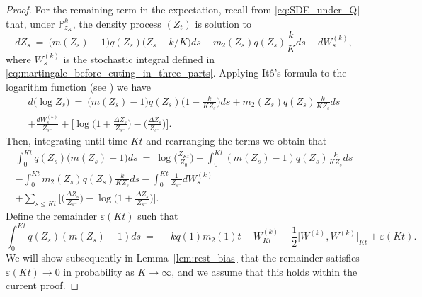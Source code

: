 \begin{refsegment}
\begin{proof}
For the remaining term in the expectation, recall from
\eqref{eq:SDE_under_Q} that, under $\mathbb{P}^k_{z_K}$, the density process
$({Z}_t)$ is solution to
\begin{equation*}
    d {Z}_s\ = \  \big({m}({Z}_s)-1\big)q({Z}_s)\big({Z}_s-k/K\big)ds + {m}_2({Z}_s)q({Z}_s)\frac{k}{K}ds + dW^{(k)}_s,
\end{equation*}
where $W^{(k)}_s$ is the stochastic integral defined in 
\eqref{eq:martingale_before_cuting_in_three_parts}.
Applying Itô's formula to the logarithm function (see \eg
\cite[Chapter II, Theorem 32]{protter_stochastic_2005}) we have
\begin{multline*}
    d\big(\log {Z}_s\big)\ =\ \big({m}({Z}_s)-1\big)q({Z}_s) \Big(1-\frac{k}{K {Z}_s}\Big)ds + {m}_2({Z}_s)q({Z}_s)\frac{k}{K{Z}_s}ds\\
   + \frac{dW^{(k)}_s }{{Z}_{s^-}}+ \bigg[\log\Big(1+\frac{\Delta {Z}_{s}}{{Z}_{s^-}}\Big)-\Big(\frac{\Delta {Z}_{s}}{{Z}_{s^-}}\Big)\bigg].
\end{multline*}
Then, integrating until time $Kt$ and rearranging the terms we obtain that
\begin{multline*}
    \int_0^{Kt} q({Z}_s)\big({m}({Z}_s)-1\big)ds\ =\   \log \Big(\frac{{Z}_{Kt}}{{Z}_0}\Big) +  \int_0^{Kt} ({m}({Z}_s)-1)q({Z}_s)\frac{ k }{K {Z}_s }ds\\
      - \int_0^{Kt} {m}_2({Z}_s)q({Z}_s)\frac{ k }{K {Z}_s }ds -  \int_0^{Kt}\frac{1}{{Z}_{s^-}} dW^{(k)}_s\\ + \sum_{s\leqslant Kt} \bigg[\Big(\frac{\Delta {Z}_{s}}{{Z}_{s^-}}\Big)-\log\Big(1+\frac{\Delta {Z}_{s}}{{Z}_{s^-}}\Big)\bigg].
\end{multline*} 
Define the remainder $\varepsilon(Kt)$ such that
\begin{equation}\label{eq:rest_bias}
    \int_0^{Kt} q({Z}_s)({m}({Z}_s)-1)ds\ = \ - k q(1)m_2(1) t - W^{(k)}_{Kt} + \frac{1}{2} \big[W^{(k)},W^{(k)}\big]_{Kt} + \varepsilon(Kt).
\end{equation}
We will show subsequently in Lemma~\ref{lem:rest_bias} that the remainder
satisfies $\varepsilon(Kt)\to 0$ in probability as $K\to\infty$, and we assume
that this holds within the current proof. 


\end{proof}
\end{refsegment}
